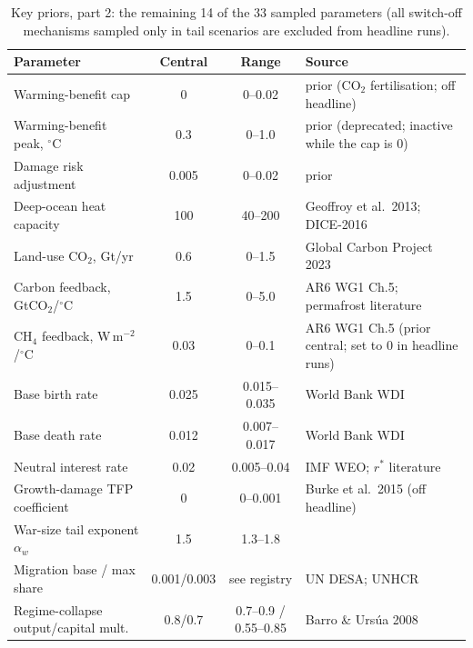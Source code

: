 \documentclass[a4paper,fleqn]{cas-sc}
\begin{document}
\begin{table}[h]
\centering
\small
\caption{Key priors, part 2: the remaining 14 of the 33 sampled parameters (all switch-off
mechanisms sampled only in tail scenarios are excluded from headline runs).}
\label{tab:priors2}
\begin{tabularx}{\linewidth}{@{}lccL@{}}
\toprule
Parameter & Central & Range & Source \\
\midrule
Warming-benefit cap & 0 & 0--0.02 & prior (CO$_2$ fertilisation; off headline) \\
Warming-benefit peak, $^{\circ}$C & 0.3 & 0--1.0 & prior (deprecated; inactive while the cap is 0) \\
Damage risk adjustment & 0.005 & 0--0.02 & prior \\
Deep-ocean heat capacity & 100 & 40--200 & Geoffroy et al.\ 2013; DICE-2016 \\
Land-use CO$_2$, Gt/yr & 0.6 & 0--1.5 & Global Carbon Project 2023 \\
Carbon feedback, GtCO$_2$/$^{\circ}$C & 1.5 & 0--5.0 & AR6 WG1 Ch.5; permafrost literature \\
CH$_4$ feedback, W\,m$^{-2}$/$^{\circ}$C & 0.03 & 0--0.1 & AR6 WG1 Ch.5 (prior central; set to 0 in headline runs) \\
Base birth rate & 0.025 & 0.015--0.035 & World Bank WDI \\
Base death rate & 0.012 & 0.007--0.017 & World Bank WDI \\
Neutral interest rate & 0.02 & 0.005--0.04 & IMF WEO; $r^*$ literature \\
Growth-damage TFP coefficient & 0 & 0--0.001 & Burke et al.\ 2015 (off headline) \\
War-size tail exponent $\alpha_w$ & 1.5 & 1.3--1.8 & \citep{richardson1948,clauset2009} \\
Migration base / max share & 0.001/0.003 & see registry & UN DESA; UNHCR \\
Regime-collapse output/capital mult. & 0.8/0.7 & 0.7--0.9 / 0.55--0.85 & Barro \& Urs{\'u}a 2008 \\
\bottomrule
\end{tabularx}
\end{table}
\end{document}
